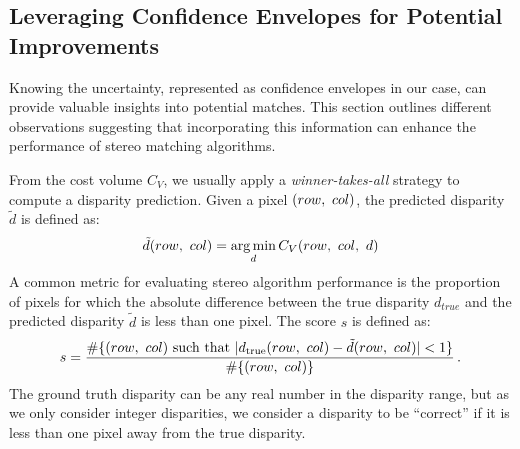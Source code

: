 \subsection{Leveraging Confidence Envelopes for Potential Improvements}\label{sec:sad_improvements}

Knowing the uncertainty, represented as confidence envelopes in our case, can provide valuable insights into potential matches. This section outlines different observations suggesting that incorporating this information can enhance the performance of stereo matching algorithms.

From the cost volume $C_V$, we usually apply a \textit{winner-takes-all} strategy to compute a disparity prediction. Given a pixel $(row, ~col)$, the predicted disparity $\tilde{d}$ is defined as:
\begin{align}\label{eq:winner_takes_all}
    \tilde{d}(row, ~col) = \operatorname*{arg\,min}_{d}C_V(row, ~col, ~d)
\end{align}
A common metric for evaluating stereo algorithm performance is the proportion of pixels for which the absolute difference between the true disparity $d_{true}$ and the predicted disparity $\tilde{d}$ is less than one pixel. The score \( s \) is defined as:
\begin{equation}\label{eq:score_d1}
    s = \frac{\#\{(row, ~col) \text{ such that } |d_{\mathrm{true}}(row, ~col) - \tilde{d}(row, ~col)| < 1\}}{\#\{(row, ~col)\}}\,.
\end{equation}
The ground truth disparity can be any real number in the disparity range, but as we only consider integer disparities, we consider a disparity to be ``correct'' if it is less than one pixel away from the true disparity.

